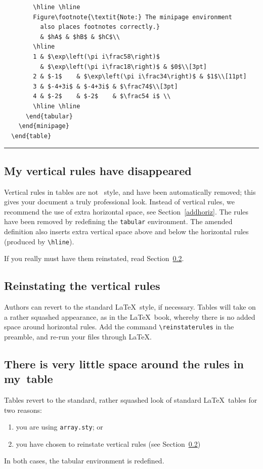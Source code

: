 \begin{table}[h!]
\begin{verbatim}
        \hline \hline
        Figure\footnote{\textit{Note:} The minipage environment
          also places footnotes correctly.}
          & $hA$ & $hB$ & $hC$\\
        \hline
        1 & $\exp\left(\pi i\frac58\right)$
          & $\exp\left(\pi i\frac18\right)$ & $0$\\[3pt]
        2 & $-1$    & $\exp\left(\pi i\frac34\right)$ & $1$\\[11pt]
        3 & $-4+3i$ & $-4+3i$ & $\frac74$\\[3pt]
        4 & $-2$    & $-2$    & $\frac54 i$ \\
        \hline \hline
      \end{tabular}
    \end{minipage}
  \end{table}
\end{verbatim}
\rule[20pt]{\textwidth}{0.5pt}
  \end{table}

\subsection{My vertical rules have disappeared}

Vertical rules in tables are not \cambridge\ style, and have been automatically removed; this gives your document a truly professional look. Instead of vertical rules, we recommend the use of extra horizontal space, see Section~\ref{addhoriz}. The rules have been removed by redefining the \verb"tabular" environment. The amended definition also inserts extra vertical space above and below the horizontal rules (produced by \verb"\hline").

If you really must have them reinstated, read Section~\ref{reinstate}.

\subsection{Reinstating the vertical rules}
\label{reinstate}
Authors can revert to the standard \LaTeX\ style, if necessary. Tables will take on a rather squashed appearance, as in the \LaTeX\ book, whereby there is no added space around horizontal rules. Add the command \verb"\reinstaterules" in the preamble, and re-run your files through \LaTeX.

\subsection{There is very little space around the rules in my~table}
Tables revert to the standard, rather squashed look of standard \LaTeX\ tables for two reasons:
\begin{enumerate}
  \item you are using \verb"array.sty"; or
  \item you have chosen to reinstate vertical rules (see Section~\ref{reinstate})
\end{enumerate}
In both cases, the tabular environment is redefined.


